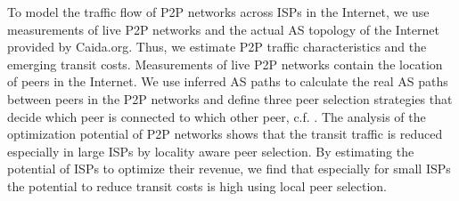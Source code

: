 To model the traffic flow of P2P networks across ISPs in the Internet, we use measurements of live P2P networks and the actual AS topology of the Internet provided by Caida.org.
Thus, we estimate P2P traffic characteristics and the emerging transit costs.
Measurements of live P2P networks contain the location of peers in the Internet.
We use inferred AS paths to calculate the real AS paths between peers in the P2P networks and define three peer selection strategies that decide which peer is connected to which other peer, c.f. \cite{burger2012profit}.
The analysis of the optimization potential of P2P networks shows that the transit traffic is reduced especially in large ISPs by locality aware peer selection.
By estimating the potential of ISPs to optimize their revenue, we find that especially for small ISPs the potential to reduce transit costs is high using local peer selection.

